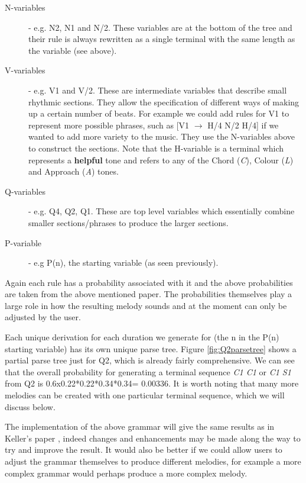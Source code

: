 \documentclass[pdftex,12pt,a4paper]{report}
\begin{document}
\begin{description}
  \item[N-variables] - e.g. N2, N1 and N/2. These variables are at the bottom of the tree and their rule is always rewritten as a single terminal with the same length as the variable (see above).
  \item[V-variables]  - e.g. V1 and V/2. These are intermediate variables that describe small rhythmic sections. They allow the specification of different ways of making up a certain number of beats. For example we could add rules for V1 to represent more possible phrases, such as [V1 $\rightarrow$ H/4 N/2 H/4] if we wanted to add more variety to the music. They use the N-variables above to construct the sections. Note that the H-variable is a terminal which represents a \textbf{helpful} tone and refers to any of the Chord (\textit{C}), Colour (\textit{L}) and Approach (\textit{A}) tones.
  \item[Q-variables] - e.g. Q4, Q2, Q1. These are top level variables which essentially combine smaller sections/phrases to produce the larger sections. 
  \item[P-variable] - e.g P(n), the starting variable (as seen previously).
\end{description}

Again each rule has a probability associated with it and the above probabilities are taken from the above mentioned paper. The probabilities themselves play a large role in how the resulting melody sounds and at the moment can only be adjusted by the user.

Each unique derivation for each duration we generate for (the n in the P(n) starting variable) has its own unique parse tree. Figure \ref{fig:Q2parsetree} shows a partial parse tree just for Q2, which is already fairly comprehensive. We can see that the overall probability for generating a terminal sequence \emph{C1 C1} or \emph{C1 S1} from Q2 is 0.6x0.22*0.22*0.34*0.34= 0.00336. It is worth noting that many more melodies can be created with one particular terminal sequence, which we will discuss below.

The implementation of the above grammar will give the same results as in Keller's paper \cite{keller07}, indeed changes and enhancements may be made along the way to try and improve the result. 
It would also be better if we could allow users to adjust the grammar themselves to produce different melodies, for example a more complex grammar would perhaps produce a more complex melody. 
\end{document}
